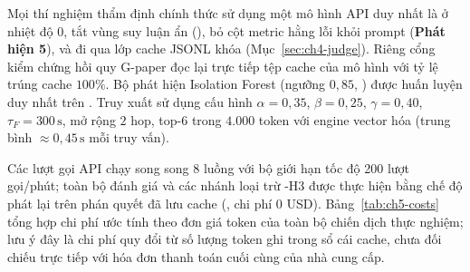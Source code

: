 Mọi thí nghiệm thẩm định chính thức sử dụng một mô hình API duy nhất là  ở nhiệt độ $0$, tắt vùng suy luận ẩn (), bỏ cột metric hằng lỗi  khỏi prompt (\textbf{Phát hiện 5}), và đi qua lớp cache JSONL khóa  (Mục~\ref{sec:ch4-judge}). Riêng cổng kiểm chứng hồi quy G-paper đọc lại trực tiếp tệp cache của mô hình  với tỷ lệ trúng cache $100\%$. Bộ phát hiện Isolation Forest (ngưỡng $0{,}85$, ) được huấn luyện duy nhất trên . Truy xuất  sử dụng cấu hình $\alpha = 0{,}35$, $\beta = 0{,}25$, $\gamma = 0{,}40$, $\tau_F = 300\,\text{s}$, mở rộng $2$ hop, top-$6$ trong $4.000$ token với engine vector hóa (trung bình $\approx 0{,}45\,\text{s}$ mỗi truy vấn).

Các lượt gọi API chạy song song 8 luồng với bộ giới hạn tốc độ 200 lượt gọi/phút; toàn bộ đánh giá \CTAV{} và các nhánh loại trừ \hyp{H3} được thực hiện bằng chế độ phát lại trên phán quyết đã lưu cache (, chi phí $0$ USD). Bảng~\ref{tab:ch5-costs} tổng hợp chi phí ước tính theo đơn giá token của toàn bộ chiến dịch thực nghiệm; lưu ý đây là chi phí quy đổi từ số lượng token ghi trong sổ cái cache, chưa đối chiếu trực tiếp với hóa đơn thanh toán cuối cùng của nhà cung cấp.

